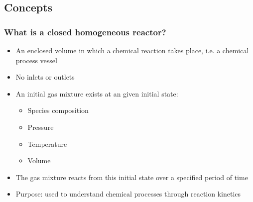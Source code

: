 \documentclass{beamer}
\begin{document}
\subsection{Concepts}
\begin{frame}
\frametitle{What is a closed homogeneous reactor?}
\begin{itemize}
  \item An enclosed volume in which a chemical reaction takes place, i.e. a chemical process vessel
  \item No inlets or outlets
  \item An initial gas mixture exists at an given initial state:
  \begin{itemize}
   \item Species composition
   \item Pressure
   \item Temperature
   \item Volume  
  \end{itemize}
  \item The gas mixture reacts from this initial state over a specified period of time
  \item Purpose: used to understand chemical processes through reaction kinetics
\end{itemize} 
\end{frame}
\end{document}
